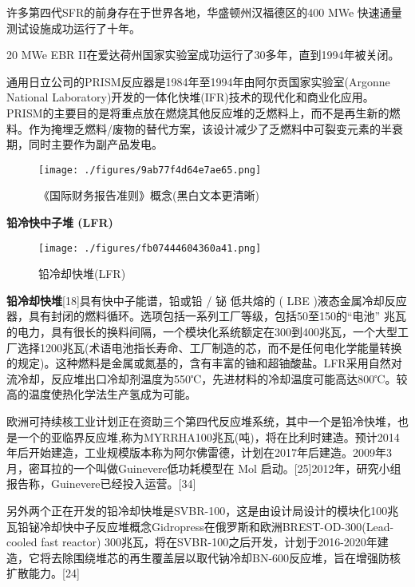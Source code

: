 许多第四代SFR的前身存在于世界各地，华盛顿州汉福德区的400 MWe 快速通量测试设施成功运行了十年。

20 MWe EBR II在爱达荷州国家实验室成功运行了30多年，直到1994年被关闭。

通用日立公司的PRISM反应器是1984年至1994年由阿尔贡国家实验室(Argonne National Laboratory)开发的一体化快堆(IFR)技术的现代化和商业化应用。PRISM的主要目的是将重点放在燃烧其他反应堆的乏燃料上，而不是再生新的燃料。作为掩埋乏燃料/废物的替代方案，该设计减少了乏燃料中可裂变元素的半衰期，同时主要作为副产品发电。
\begin{figure}[ht]
\centering
\texttt{[image: ./figures/9ab77f4d64e7ae65.png]}
\caption{《国际财务报告准则》概念(黑白文本更清晰)} \label{fig_FYD_6}
\end{figure}

\textbf{铅冷快中子堆 (LFR)}

\begin{figure}[ht]
\centering
\texttt{[image: ./figures/fb07444604360a41.png]}
\caption{铅冷却快堆(LFR)} \label{fig_FYD_8}
\end{figure}
\textbf{铅冷却快堆}[18]具有快中子能谱，铅或铅 / 铋 低共熔的 ( LBE )液态金属冷却反应器，具有封闭的燃料循环。选项包括一系列工厂等级，包括50至150的“电池” 兆瓦的电力，具有很长的换料间隔，一个模块化系统额定在300到400兆瓦，一个大型工厂选择1200兆瓦(术语电池指长寿命、工厂制造的芯，而不是任何电化学能量转换的规定)。这种燃料是金属或氮基的，含有丰富的铀和超铀酸盐。LFR采用自然对流冷却，反应堆出口冷却剂温度为550℃，先进材料的冷却温度可能高达800℃。较高的温度使热化学法生产氢成为可能。

欧洲可持续核工业计划正在资助三个第四代反应堆系统，其中一个是铅冷快堆，也是一个的亚临界反应堆,称为MYRRHA100兆瓦(吨)，将在比利时建造。预计2014年后开始建造，工业规模版本称为阿尔佛雷德，计划在2017年后建造。2009年3月，密耳拉的一个叫做Guinevere低功耗模型在 Mol 启动。[25]2012年，研究小组报告称，Guinevere已经投入运营。[34]

另外两个正在开发的铅冷却快堆是SVBR-100，这是由设计局设计的模块化100兆瓦铅铋冷却快中子反应堆概念Gidropress在俄罗斯和欧洲BREST-OD-300(Lead-cooled fast reactor) 300兆瓦，将在SVBR-100之后开发，计划于2016-2020年建造，它将去除围绕堆芯的再生覆盖层以取代钠冷却BN-600反应堆，旨在增强防核扩散能力。[24]

